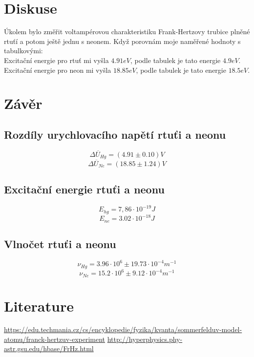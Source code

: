 \documentclass{article}
\begin{document}
\section{Diskuse}
Úkolem bylo změřit voltampérovou charakteristiku Frank-Hertzovy trubice plněné rtuťí a potom ještě
jednu s neonem. Když porovnám moje naměřené hodnoty s tabulkovými: \\
Excitační energie pro rtuť mi vyšla $4.91 eV$, podle tabulek je tato energie $4.9 eV$. \\
Excitační energie pro neon mi vyšla $18.85 eV$, podle tabulek je tato energie $18.5 eV$. \\
\section{Závěr}
\subsection{Rozdíly urychlovacího napětí rtuťi a neonu}
$$\overline{\Delta U_{Hg}} = (4.91 \pm 0.10) V $$
$$\overline{\Delta U_{Ne}} = (18.85 \pm 1.24) V $$
\subsection{Excitační energie rtuťi a neonu}
$$E_{hg} = 7,86 \cdot 10^{-19} J$$
$$E_{ne} = 3.02 \cdot 10^{-18} J$$
\subsection{Vlnočet rtuťi a neonu}
$$\nu _{Hg} = 3.96 \cdot 10^{6} \pm 19.73 \cdot 10^{-4} m^{-1}$$
$$\nu _{Ne} = 15.2 \cdot 10^{6} \pm 9.12 \cdot 10^{-4} m^{-1}$$
\section{Literature}
\url{https://edu.techmania.cz/cs/encyklopedie/fyzika/kvanta/sommerfelduv-model-atomu/franck-hertzuv-experiment}
\url{http://hyperphysics.phy-astr.gsu.edu/hbase/FrHz.html}
\end{document}
